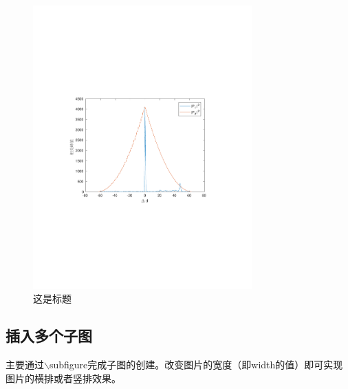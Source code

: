 \begin{figure}[h]
 \centering
 \includegraphics[width=0.75\textwidth]{HelperSection/figures/correlation_P.pdf}
 \caption{这是标题}\label{fig:correlation_P1_P2}
\end{figure}
\subsection{插入多个子图}
主要通过$\backslash$subfigure完成子图的创建。改变图片的宽度（即width的值）即可实现图片的横排或者竖排效果。

